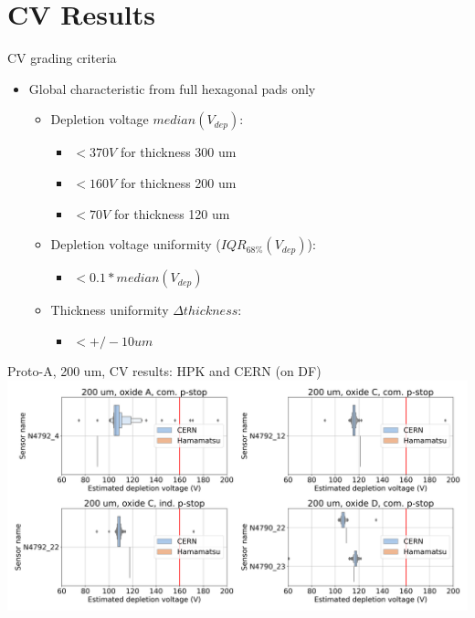 \documentclass{beamer}
\begin{document}
\section{CV Results}

\begin{frame}{CV grading criteria}
  \begin{itemize}
      \item \alert{Global} characteristic from full hexagonal pads only
        \begin{itemize}
          \item Depletion voltage $ median(V_{dep}) $:
            \begin{itemize}
             \item $ < 370 V $ for thickness 300 um
             \item $ < 160 V $ for thickness 200 um
             \item $ < 70 V $ for thickness 120 um  
            \end{itemize}
          \item Depletion voltage uniformity ($ IQR_{68\%}(V_{dep}) $):
            \begin{itemize}
              \item $< 0.1 * median(V_{dep})$
            \end{itemize}
          \item Thickness uniformity ${\Delta} thickness$:
            \begin{itemize}
              \item $< +/- 10um $
            \end{itemize}
        \end{itemize}
  \end{itemize}
\end{frame}

\begin{frame}{Proto-A, 200 um, CV results: HPK and CERN (on DF)}
  \includegraphics[width=.9\textwidth]{plots/CV_ComparisonHPK_200um.png}
  \href{https://indico.cern.ch/event/1132823/contributions/4755812/attachments/2399581/4103704/LD\%20proto-A\%20sensors\%20200\%20um\%2C\%20ALPS\%20Winter\%202022.pdf}{}
\end{frame}
\end{document}
